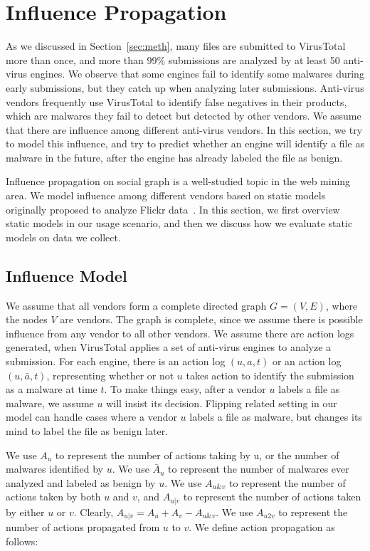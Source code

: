 \section{Influence Propagation}
\label{sec:influ}

As we discussed in Section~\ref{sec:meth}, 
many files are submitted to VirusTotal more than once, 
and more than 99\% submissions are analyzed by at least 50 anti-virus engines. 
We observe that some engines fail to identify some malwares during early submissions, 
but they catch up when analyzing later submissions. 
Anti-virus vendors frequently use VirusTotal to identify false negatives in their products, 
which are malwares they fail to detect but detected by other vendors. 
We assume that there are influence among different anti-virus vendors.
In this section, we try to model this influence,
and try to predict whether an engine will identify a file as malware in the future, 
after the engine has already labeled the file as benign.

Influence propagation on social graph is a well-studied topic in the web mining area. 
We model influence among different vendors based on static models 
originally proposed to analyze Flickr data~\cite{Influence}.
In this section, we first overview static models in our usage scenario,
and then we discuss how we evaluate static models on data we collect. 

\subsection{Influence Model}
\label{sec:model}


We assume that all vendors form a complete directed graph $G = (V, E)$, 
where the nodes $V$ are vendors. 
The graph is complete, 
since we assume there is possible influence from any vendor to all other vendors.
We assume there are action logs generated, 
when VirusTotal applies a set of anti-virus engines to analyze a submission. 
For each engine, there is an action log $(u, a, t)$ or an action log $(u, \bar{a}, t)$, 
representing whether or not $u$ takes action to identify the submission as a malware at time $t$. 
To make things easy, after a vendor $u$ labels a file as malware, 
we assume $u$ will insist its decision.
{\color{red} Flipping related setting in our model can handle cases where a vendor $u$ labels a file as malware, 
but changes its mind to label the file as benign later.}

We use $A_u$ to represent the number of actions taking by u, 
or the number of malwares identified by $u$. 
We use $\bar{A}_u$ to represent the number of malwares ever analyzed and labeled as benign by $u$.
We use $A_{u\&v}$ to represent the number of actions taken by both $u$ and $v$, 
and $A_{u|v}$ to represent the number of actions taken by either $u$ or $v$.
Clearly, $A_{u|v} =   A_u + A_v - A_{u\&v}$.
We use $A_{u2v}$ to represent the number of actions propagated from $u$ to $v$. 
We define action propagation as follows: 


